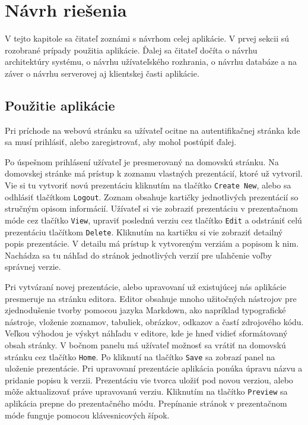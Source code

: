 \chapter{Návrh riešenia}
V tejto kapitole sa čitateľ zoznámi s návrhom celej aplikácie. V prvej sekcii sú rozobrané prípady použitia aplikácie. Ďalej sa čitateľ dočíta o návrhu architektúry systému, o návrhu užívateľského rozhrania, o návrhu databáze a na záver o návrhu serverovej aj klientskej časti aplikácie.

\section{Použitie aplikácie}
Pri príchode na webovú stránku sa užívateľ ocitne na autentifikačnej stránka kde sa musí prihlásiť, alebo zaregistrovať, aby mohol postúpiť ďalej.

Po úspešnom prihlásení užívateľ je presmerovaný na domovskú stránku. Na domovskej stránke má prístup k zoznamu vlastných prezentácií, ktoré už vytvoril. Vie si tu vytvoriť novú prezentáciu kliknutím na tlačítko \texttt{Create New}, alebo sa odhlásiť tlačítkom \texttt{Logout}. Zoznam obsahuje kartičky jednotlivých prezentácií so stručným opisom informácií. Užívateľ si vie zobraziť prezentáciu v prezentačnom móde cez tlačítko \texttt{View}, upraviť poslednú verziu cez tlačítko \texttt{Edit} a odstrániť celú prezentáciu tlačítkom \texttt{Delete}. Kliknutím na kartičku si vie zobraziť detailný popis prezentácie. V detailu má prístup k vytvoreným verziám a popisom k nim. Nachádza sa tu náhľad do stránok jednotlivých verzií pre uľahčenie voľby správnej verzie.

Pri vytváraní novej prezentácie, alebo upravovaní už existujúcej nás aplikácie presmeruje na stránku editora. Editor obsahuje mnoho užitočných nástrojov pre zjednodušenie tvorby pomocou jazyka Markdown, ako napríklad typografické nástroje, vloženie zoznamov, tabuliek, obrázkov, odkazov a častí zdrojového kódu. Veľkou výhodou je výskyt náhľadu v editore, kde je hneď vidieť sformátovaný obsah stránky. V bočnom panelu má užívateľ možnosť sa vrátiť na domovskú stránku cez tlačítko \texttt{Home}. Po kliknutí na tlačítko \texttt{Save} sa zobrazí panel na uloženie prezentácie. Pri upravovaní prezentácie aplikácia ponúka úpravu názvu a pridanie popisu k verzii. Prezentáciu vie tvorca uložiť pod novou verziou, alebo môže aktualizovať práve upravovanú verziu. Kliknutím na tlačítko \texttt{Preview} sa aplikácia prepne do prezentačného módu. Prepínanie stránok v prezentačnom móde funguje pomocou klávesnicových šípok. 

